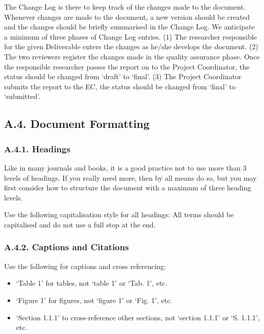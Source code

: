 The Change Log is there to keep track of the changes made to the document. Whenever changes are made to the document, a new version should be created and the changes should be briefly summarised in the Change Log. We anticipate a minimum of three phases of Change Log entries. (1) The researcher responsible for the given Deliverable enters the changes as he/she develops the document. (2) The two reviewers register the changes made in the quality assurance phase. Once the responsible researcher passes the report on to the Project Coordinator, the status should be changed from ‘draft’ to ‘final’. (3) The Project Coordinator submits the report to the EC, the status should be changed from ‘final’ to ‘submitted’.

\subsection*{A.4. Document Formatting}
\label{sec:appendix-a4-document-formatting}

\subsubsection*{A.4.1. Headings}
\label{sec:appendix-a41-headings}

Like in many journals and books, it is a good practice not to use more than 3 levels of headings. If you really need more, then by all means do so, but you may first consider how to structure the document with a maximum of three heading levels. 

Use the following capitalisation style for all headings: All terms should be capitalised and do not use a full stop at the end.

\subsubsection*{A.4.2. Captions and Citations}
\label{sec:appendix-a42-captions-and-citations}

Use the following for captions and cross referencing:

\begin{itemize}
	\item ‘Table 1’ for tables, not ‘table 1’ or ‘Tab. 1’, etc.
	\item ‘Figure 1’ for figures, not ‘figure 1’ or ‘Fig. 1’, etc.
	\item ‘Section 1.1.1’ to cross-reference other sections, not ‘section 1.1.1’ or ‘S. 1.1.1’, etc.
\end{itemize}


